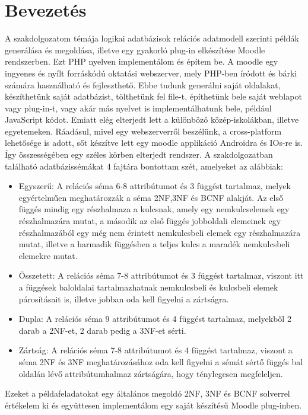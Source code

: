 \chapter*{Bevezetés}
A szakdolgozatom témája logikai adatbázisok relációs adatmodell szerinti példák generálása és megoldása, illetve egy gyakorló plug-in elkészítése Moodle rendszerben. Ezt PHP nyelven implementálom és építem be. A moodle egy ingyenes és nyílt forráskódú oktatási webszerver, mely PHP-ben íródott és bárki számára használható és fejleszthető. Ebbe tudunk generálni saját oldalakat, készíthetünk saját adatbázist, tölthetünk fel file-t, építhetünk bele saját weblapot vagy plug-in-t, vagy akár más nyelvet is implementálhatunk bele, például JavaScript kódot. Emiatt elég elterjedt lett a különböző közép-iskolákban, illetve egyetemeken. Ráadásul, mivel egy webszerverről beszélünk, a cross-platform lehetősége is adott, sőt készítve lett egy moodle applikáció Androidra és IOs-re is. Így összességében egy széles körben elterjedt rendszer. \hfill \newline
A szakdolgozatban található adatbázissémákat 4 fajtára bontottam szét, amelyeket az alábbiak:\hfill \newline
\begin{itemize}
    \item Egyszerű: A relációs séma 6-8 attribútumot és 3 függést tartalmaz, melyek egyértelműen meghatározzák a séma 2NF,3NF és BCNF alakját. Az első függés mindig egy részhalmaza a kulcsnak, amely egy nemkulcselemek egy részhalmazára mutat, a második az első függés jobboldali elemeinek egy részhalmazából egy még nem érintett nemkulcsbeli elemek egy részhalmazára mutat, illetve a harmadik függésben a teljes kulcs a maradék nemkulcsbeli elemekre mutat.
    \item Összetett: A relációs séma 7-8 attribútumot és 3 függést tartalmaz, viszont itt a függések baloldalai tartalmazhatnak nemkulcsbeli és kulcsbeli elemek párosításait is, illetve jobban oda kell figyelni a zártságra.
    \item Dupla: A relációs séma 9 attribútumot és 4 függést tartalmaz, melyekből 2 darab a 2NF-et, 2 darab pedig a 3NF-et sérti.
    \item Zártság: A relációs séma 7-8 attribútumot és 4 függést tartalmaz, viszont a séma 2NF és 3NF meghatározásához oda kell figyelni a sémát sértő függés bal oldalán lévő attribútumhalmaz zártságára, hogy ténylegesen megfeleljen.
\end{itemize}
Ezeket a példafeladatokat egy általános megoldó 2NF, 3NF és BCNF solverrel értékelem ki és együttesen implementálom egy saját készítésű Moodle plug-inben.